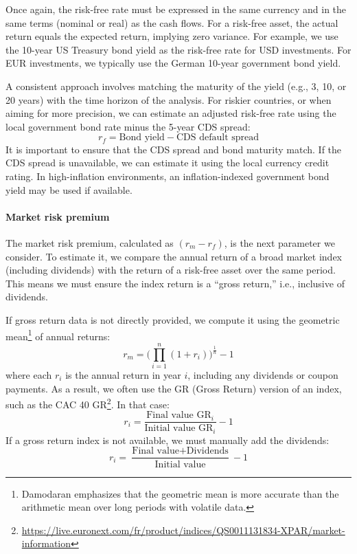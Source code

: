 Once again, the risk-free rate must be expressed in the same currency and in the same terms (nominal or real) as the cash flows. For a risk-free asset, the actual return equals the expected return, implying zero variance. For example, we use the 10-year US Treasury bond yield as the risk-free rate for USD investments. For EUR investments, we typically use the German 10-year government bond yield.

A consistent approach involves matching the maturity of the yield (e.g., 3, 10, or 20 years) with the time horizon of the analysis. For riskier countries, or when aiming for more precision, we can estimate an adjusted risk-free rate using the local government bond rate minus the 5-year CDS spread:
\begin{equation}
    r_f = \text{Bond yield} - \text{CDS default spread}
\end{equation}
It is important to ensure that the CDS spread and bond maturity match. If the CDS spread is unavailable, we can estimate it using the local currency credit rating. In high-inflation environments, an inflation-indexed government bond yield may be used if available.

\paragraph{Market risk premium}

The market risk premium, calculated as $(r_m - r_f)$, is the next parameter we consider. To estimate it, we compare the annual return of a broad market index (including dividends) with the return of a risk-free asset over the same period. This means we must ensure the index return is a “gross return,” i.e., inclusive of dividends.

If gross return data is not directly provided, we compute it using the geometric mean\footnote{Damodaran emphasizes that the geometric mean is more accurate than the arithmetic mean over long periods with volatile data.} of annual returns:
\begin{equation}
    r_m = \bigg( \prod^n_{i=1}(1 + r_i)\bigg)^\frac{1}{n} - 1
\end{equation}
where each $r_i$ is the annual return in year $i$, including any dividends or coupon payments. As a result, we often use the GR (Gross Return) version of an index, such as the CAC 40 GR\footnote{\href{See more here on Euronext website}{https://live.euronext.com/fr/product/indices/QS0011131834-XPAR/market-information}}. In that case:
\begin{equation}
    r_i = \frac{\text{Final value GR}_i}{\text{Initial value GR}_i} - 1
\end{equation}
If a gross return index is not available, we must manually add the dividends:
\begin{equation}
    r_i = \frac{\text{Final value} + \text{Dividends}}{\text{Initial value}} - 1
\end{equation}

